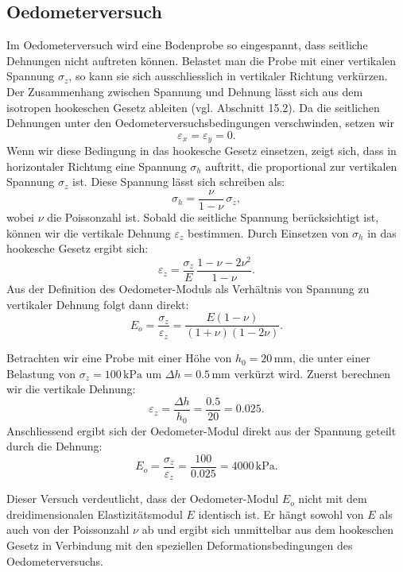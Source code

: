 \subsection{Oedometerversuch}
Im Oedometerversuch wird eine Bodenprobe so eingespannt, dass seitliche Dehnungen nicht auftreten können. 
Belastet man die Probe mit einer vertikalen Spannung \(\sigma_z\), so kann sie sich ausschliesslich in vertikaler Richtung verkürzen.  
Der Zusammenhang zwischen Spannung und Dehnung lässt sich aus dem isotropen hookeschen Gesetz ableiten (vgl. Abschnitt 15.2). 
Da die seitlichen Dehnungen unter den Oedometerversuchsbedingungen verschwinden, setzen wir
\[
  \varepsilon_x = \varepsilon_y = 0.
\]
Wenn wir diese Bedingung in das hookesche Gesetz einsetzen, zeigt sich, dass in horizontaler Richtung eine Spannung \(\sigma_h\) auftritt, die proportional zur vertikalen Spannung \(\sigma_z\) ist. 
Diese Spannung lässt sich schreiben als:
\[
  \sigma_h = \frac{\nu}{1-\nu}\,\sigma_z,
\]
wobei \(\nu\) die Poissonzahl ist.  
Sobald die seitliche Spannung berücksichtigt ist, können wir die vertikale Dehnung \(\varepsilon_z\) bestimmen. 
Durch Einsetzen von \(\sigma_h\) in das hookesche Gesetz ergibt sich:
\[
  \varepsilon_z = \frac{\sigma_z}{E}\,\frac{1-\nu-2\nu^2}{1-\nu}.
\]
Aus der Definition des Oedometer-Moduls als Verhältnis von Spannung zu vertikaler Dehnung folgt dann direkt:
\[
  E_o = \frac{\sigma_z}{\varepsilon_z} = \frac{E(1-\nu)}{(1+\nu)(1-2\nu)}.
\]
\begin{beispiel}   
Betrachten wir eine Probe mit einer Höhe von \(h_0 = 20\,\mathrm{mm}\), die unter einer Belastung von \(\sigma_z = 100\,\mathrm{kPa}\) um \(\Delta h = 0.5\,\mathrm{mm}\) verkürzt wird.  
Zuerst berechnen wir die vertikale Dehnung:
\[
  \varepsilon_z = \frac{\Delta h}{h_0} = \frac{0.5}{20} = 0.025.
\]
Anschliessend ergibt sich der Oedometer-Modul direkt aus der Spannung geteilt durch die Dehnung:
\[
  E_o = \frac{\sigma_z}{\varepsilon_z} = \frac{100}{0.025} = 4000\,\mathrm{kPa}.
\]
\end{beispiel}  
Dieser Versuch verdeutlicht, dass der Oedometer-Modul \(E_o\) nicht mit dem dreidimensionalen Elastizitätsmodul \(E\) identisch ist. 
Er hängt sowohl von \(E\) als auch von der Poissonzahl \(\nu\) ab und ergibt sich unmittelbar aus dem hookeschen Gesetz in Verbindung mit den speziellen Deformationsbedingungen des Oedometerversuchs.
